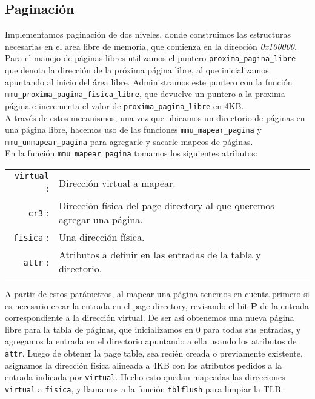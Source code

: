 \subsection{Paginación}
\label{sec-paginacion} 

Implementamos paginación de dos niveles, donde construimos las estructuras necesarias en  el area libre de memoria, que comienza en la dirección \textit{0x100000}.\\
Para el manejo de páginas libres utilizamos el puntero \verb|proxima_pagina_libre| que denota la dirección de la próxima página libre, al que inicializamos apuntando al inicio del área libre.
Administramos este puntero con la función \verb|mmu_proxima_pagina_fisica_libre|, que devuelve un puntero a la proxima página e incrementa el valor de \verb|proxima_pagina_libre| en 4KB.\\

A través de estos mecanismos, una vez que ubicamos un directorio de páginas en una página libre, hacemos uso de las funciones \verb|mmu_mapear_pagina| y \verb|mmu_unmapear_pagina| para agregarle y sacarle mapeos de páginas.\\

En la función \verb|mmu_mapear_pagina| tomamos los siguientes atributos:


\begin{center}
	\begin{tabular}{r p{} }
		\verb|virtual| : & Dirección virtual a mapear. \\
		\verb|cr3| : & Dirección física del page directory al que queremos agregar una página.\\
		\verb|fisica| : & Una dirección física. \\
		\verb|attr| : & Atributos a definir en las entradas de la tabla y directorio.\\
	\end{tabular}
\end{center}
\vspace{10pt}


A partir de estos parámetros, al mapear una página tenemos en cuenta primero si es necesario crear la entrada en el page directory, revisando el bit \textbf{P} de la entrada correspondiente a la dirección virtual.
De ser así obtenemos una nueva página libre para la tabla de páginas, que inicializamos en 0 para todas sus entradas, y agregamos la entrada en el directorio apuntando a ella usando los atributos de \verb|attr|.
Luego de obtener la page table, sea recién creada o previamente existente, asignamos la dirección física alineada a 4KB con los atributos pedidos a la entrada indicada por \verb|virtual|.
Hecho esto quedan mapeadas las direcciones \verb|virtual| a \verb|fisica|, y llamamos a la función \verb|tblflush| para limpiar la TLB.\\


